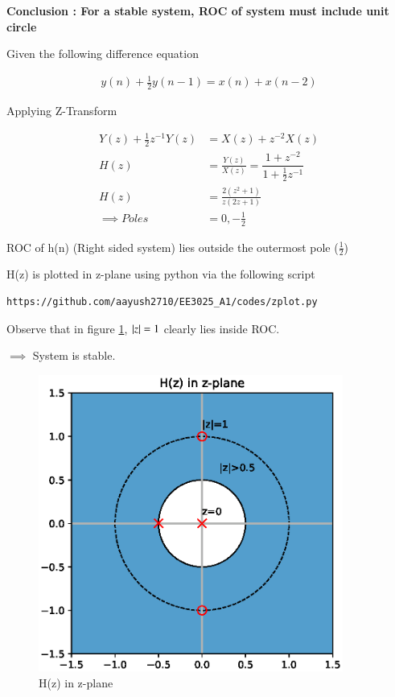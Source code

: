 \documentclass[journal,12pt,twocolumn]{IEEEtran}
\begin{document}
\textbf{Conclusion : For a stable system, ROC of system must include unit circle}

Given the following difference equation

\begin{align}
y(n) + \frac{1}{2} y(n-1) = x(n) + x(n-2)
\end{align}

Applying Z-Transform

\begin{align}
Y(z) + \frac{1}{2} z^{-1}Y(z) &= X(z) + z^{-2}X(z) \\
H(z) &= \frac{Y(z)}{X(z)} = \dfrac{1 + z^{-2}}{1 + \frac{1}{2} z^{-1}} \\
H(z) &= \frac{2(z^{2} +1)}{z(2z+1)} \\
\implies Poles &= 0 , -\frac{1}{2}
\end{align}

ROC of h(n) (Right sided system) lies outside the outermost pole ($\frac{1}{2}$)

H(z) is plotted in z-plane using python via the following script
\\
\begin{lstlisting}
https://github.com/aayush2710/EE3025_A1/codes/zplot.py
\end{lstlisting}

Observe that in figure \ref{Z_plane analysis}, $\left\vert z\right\vert = 1$ clearly lies inside ROC.

$\implies$ System is stable.


\begin{figure}[h!]
    \centering
    \includegraphics[width=10cm]{./figs/zplane.eps}
    \caption{H(z) in z-plane}
    \label{Z_plane analysis}
\end{figure}
\end{document}
